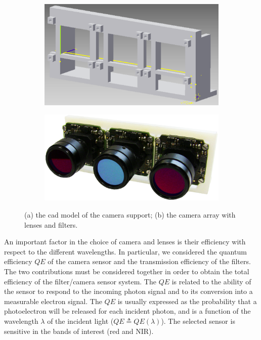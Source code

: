 \documentclass[letterpaper, 10pt, conference]{ieeeconf}      %
\begin{document}
\begin{figure}[t]
        \vspace{2mm}\centering
\begin{subfigure}[t]{0.25\textwidth}
	     \includegraphics[width=0.9\linewidth, trim=0 22 0 0]{../images/support_camera_3x1.png}
      	\vspace{-0.2cm}
    		\caption{} 
		\label{fig:Cadmodel}
    \end{subfigure}%
    \hspace{-0.4cm}%
    \begin{subfigure}[t]{0.25\textwidth}
      	\includegraphics[width=0.9\linewidth, trim=0 28 0 0]{../images/IMG_0198.JPG}
      	\vspace{-0.2cm}
      	\caption{}
     		\label{fig:camera}
    \end{subfigure}
    \caption{(a) the cad model of the camera support; (b) the camera array with lenses and filters.}
         \vspace{-5mm}
\end{figure}


An important factor in the choice of camera and lenses is their efficiency with respect to the different wavelengths.
In particular, we considered the quantum efficiency $QE$ of the camera sensor and the transmission efficiency of the filters.
The two contributions must be considered together in order to obtain the  total efficiency of the filter/camera sensor system.
%
The $QE$ is related to the ability of the sensor to respond to the incoming photon signal and to its conversion into a measurable electron signal.
The $QE$ is usually expressed as the probability that a photoelectron will be released for each incident photon, and is a function of the wavelength $\lambda$ of the incident light ($QE\triangleq QE(\lambda)$).
The selected sensor is sensitive in the bands of interest (red and NIR).
\end{document}
